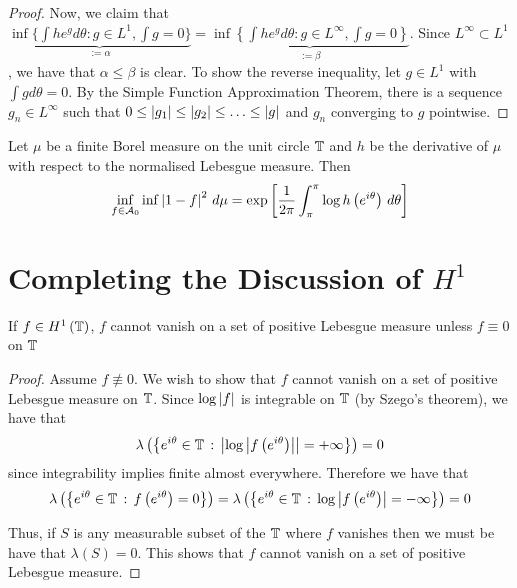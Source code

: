 \begin{proof}
    Now, we claim that $\underbrace{\inf \{ \int he^{g} d\theta : g \in L^{1}, \int g =0 \}}_{:=\alpha} = \underbrace{\inf \left\{ \int he^{g} d\theta : g \in L^{\infty} , \int g =0 \right\}}_{:=\beta}$. Since $L^{\infty} \subset L^{1}$, we have that $\alpha \le \beta$ is clear. To show the reverse inequality, let $g \in L^{1}$ with $\int g d\theta = 0$. By the Simple Function Approximation Theorem, there is a sequence $g_{n} \in L^{\infty}$ such that $0 \le \left\lvert g_1 \right\rvert \le \left\lvert g_2 \right\rvert \le \ldots \le \left\lvert g \right\rvert$ and $g_{n}$ converging to $g$ pointwise.

\end{proof}

\begin{theorem}
    Let $\mu$ be a finite Borel measure on the unit circle $\mathbb T$ and $h$ be the derivative of $\mu$ with respect to the normalised Lebesgue measure. Then
    \begin{equation*}
	\inf_{f\in {\cal A}_{0}} \inf \left\lvert 1-f \right\rvert^{2} \, d\mu = \exp  \left[ \frac{1}{2\pi} \int_{\pi}^{\pi} \log h\left( e^{i\theta} \right) \, d\theta \right]
    \end{equation*}
    \label{thm:szego-kolmogoroff-krein}
\end{theorem}

\section{Completing the Discussion of \texorpdfstring{$H^1$}{}}

\begin{corollary}
    If $f \in H^{1} \left( \mathbb T \right)$, $f$ cannot vanish on a set of positive Lebesgue measure unless $f \equiv 0$ on $\mathbb T$
    \label{cor:H1-f-zero}
\end{corollary}
\begin{proof}
    Assume $f\not\equiv 0$. We wish to show that $f$ cannot vanish on a set of positive Lebesgue measure on $\mathbb T$. Since $\log \left\lvert f \right\rvert$ is integrable on $\mathbb T$ (by Szego's theorem), we have that 
    \begin{equation*}
	\lambda \left( \left\{ e^{i\theta} \in \mathbb T \, : \, \left\lvert \log \left\lvert f\left( e^{i\theta}  \right) \right\rvert \right\rvert  = +\infty\right\} \right) = 0
    \end{equation*}
    since integrability implies finite almost everywhere. Therefore we have that 
    \begin{equation*}
	\lambda \left( \left\{ e^{i\theta} \in \mathbb T \, : \, f\left( e^{i\theta} \right) = 0 \right\} \right) = \lambda \left( \left\{ e^{i\theta} \in \mathbb T \, : \, \log \left\lvert f\left( e^{i\theta}  \right) \right\rvert  = -\infty\right\} \right) = 0
    \end{equation*}
   
    Thus, if $S$ is any measurable subset of the $\mathbb T$ where $f$ vanishes then we must be have that $\lambda \left( S \right) = 0$. This shows that $f$ cannot vanish on a set of positive Lebesgue measure.
\end{proof}

